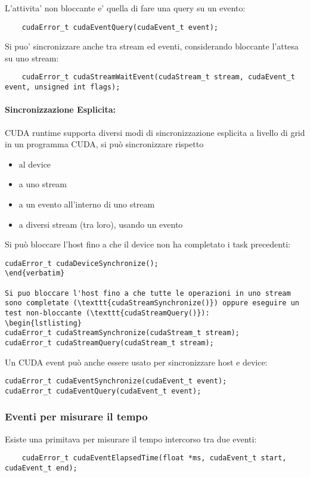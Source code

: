 L'attivita' non bloccante e' quella di fare una query su un evento:
\begin{lstlisting}
    cudaError_t cudaEventQuery(cudaEvent_t event);
\end{lstlisting}

Si puo' sincronizzare anche tra stream ed eventi, considerando bloccante l'attesa su uno stream:
\begin{lstlisting}
    cudaError_t cudaStreamWaitEvent(cudaStream_t stream, cudaEvent_t event, unsigned int flags);
\end{lstlisting}

\paragraph{Sincronizzazione Esplicita:} CUDA runtime supporta diversi modi di sincronizzazione esplicita a livello di grid in un programma CUDA, si può sincronizzare rispetto
\begin{itemize}
	\item al device
	
	\item a uno stream
	
	\item a un evento all'interno di uno stream
	
	\item a diversi stream (tra loro), usando un evento
\end{itemize}

Si può bloccare l'host fino a che il device non ha completato i task precedenti:
\begin{lstlisting}
cudaError_t cudaDeviceSynchronize();
\end{verbatim}

Si puo bloccare l'host fino a che tutte le operazioni in uno stream sono completate (\texttt{cudaStreamSynchronize()}) oppure eseguire un test non-bloccante (\texttt{cudaStreamQuery()}):
\begin{lstlisting}
cudaError_t cudaStreamSynchronize(cudaStream_t stream);
cudaError_t cudaStreamQuery(cudaStream_t stream);
\end{lstlisting}

Un CUDA event può anche essere usato per sincronizzare host e device:
\begin{lstlisting}
cudaError_t cudaEventSynchronize(cudaEvent_t event);
cudaError_t cudaEventQuery(cudaEvent_t event);
\end{lstlisting}

\subsubsection{Eventi per misurare il tempo}
Esiste una primitava per misurare il tempo intercorso tra due eventi:
\begin{lstlisting}
    cudaError_t cudaEventElapsedTime(float *ms, cudaEvent_t start, cudaEvent_t end);
\end{lstlisting}

